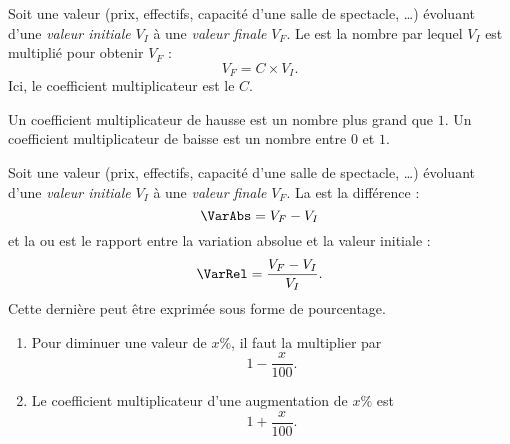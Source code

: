 \begin{definition}
    Soit une valeur (prix, effectifs, capacité d'une salle de spectacle, \ldots) évoluant d'une \emph{valeur initiale} \( V_I\) à une \emph{valeur finale} \( V_F\). Le  est la nombre par lequel \( V_I\) est multiplié pour obtenir \( V_F\) :
    \begin{equation}
        V_F=C\times V_I.
    \end{equation}
    Ici, le coefficient multiplicateur est le \( C\).
\end{definition}

Un coefficient multiplicateur de hausse est un nombre plus grand que \( 1\). Un coefficient multiplicateur de baisse est un nombre entre \( 0\) et \( 1\).

\begin{definition}
    Soit une valeur (prix, effectifs, capacité d'une salle de spectacle, \ldots) évoluant d'une \emph{valeur initiale} \( V_I\) à une \emph{valeur finale} \( V_F\). La  est la différence :
    \begin{equation}
        \VarAbs=V_F-V_I
    \end{equation}
    et la  ou  est le rapport entre la variation absolue et la valeur initiale :
    \begin{equation}
        \VarRel=\frac{ V_F-V_I }{ V_I }.
    \end{equation}
    Cette dernière peut être exprimée sous forme de pourcentage.
\end{definition}

\begin{Aretenir}
    \begin{enumerate}
        \item
            Pour diminuer une valeur de \( x\%\), il faut la multiplier par 
            \begin{equation}
                1-\frac{ x }{ 100 }.
            \end{equation}
        \item
            Le coefficient multiplicateur d'une augmentation de \( x\%\) est
            \begin{equation}
                1+\frac{ x }{ 100 }.
            \end{equation}
    \end{enumerate}
\end{Aretenir}

